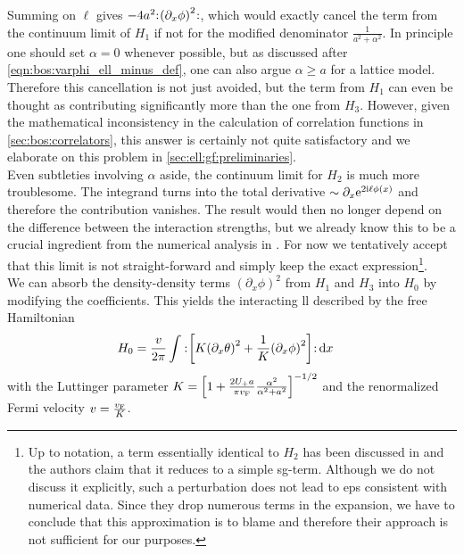 Summing on $\ell$ gives $-4a^2\normord{\kla*{\partial_x\phi}^2}$, which would exactly cancel the term from the continuum limit of $H_1$ if not for the modified denominator $\frac{1}{a^2+\alpha^2}$.
In principle one should set $\alpha=0$ whenever possible, but as discussed after \autoref{eqn:bos:varphi_ell_minus_def}, one can also argue $\alpha\ge a$ for a lattice model.
Therefore this cancellation is not just avoided, but the term from $H_1$ can even be thought as contributing significantly more than the one from $H_3$.
However, given the mathematical inconsistency in the calculation of correlation functions in \autoref{sec:bos:correlators}, this answer is certainly not quite satisfactory and we elaborate on this problem in \autoref{sec:ell:gf:preliminaries}.\\
Even subtleties involving $\alpha$ aside, the continuum limit for $H_2$ is much more troublesome.
The integrand turns into the total derivative $\asympropto{} \partial_x\powe{2\i\ell\phi(x)}$ and therefore the contribution vanishes.
The result would then no longer depend on the difference between the interaction strengths, but we already know this to be a crucial ingredient from the numerical analysis in \cite{EP_DynamicInduced_Quenched_Lehmann_2021}.
For now we tentatively accept that this limit is not straight-forward and simply keep the exact expression\footnote{Up to notation, a term essentially identical to $H_2$ has been discussed in \cite{Bosonization_incorrect_H2_Orignac_2004} and the authors claim that it reduces to a simple \gls{sg}-term.
Although we do not discuss it explicitly, such a perturbation does not lead to \glspl{ep} consistent with numerical data.
Since they drop numerous terms in the expansion, we have to conclude that this approximation is to blame and therefore their approach is not sufficient for our purposes.}.\\
We can absorb the density-density terms $(\partial_x\phi)^2$ from $H_1$ and $H_3$ into $H_0$ by modifying the coefficients.
This yields the interacting \gls{ll} described by the free Hamiltonian
\begin{align}
H_0 &= \frac{v}{2\pi} \intx{ }{ }{\normord{\klb*{K\kla*{\partial_x\theta}^2 + \frac{1}{K} \kla*{\partial_x\phi}^2}}}{x} \label{eqn:ell:bos:LL_interacting_H0} %
\end{align}
with the Luttinger parameter $K=\klb*{1 + \frac{2U_+a}{\pi\vf} \frac{\alpha^2}{\alpha^2+a^2}}^{-1/2}$ and the renormalized Fermi velocity $v=\frac{\vf}{K}$.
